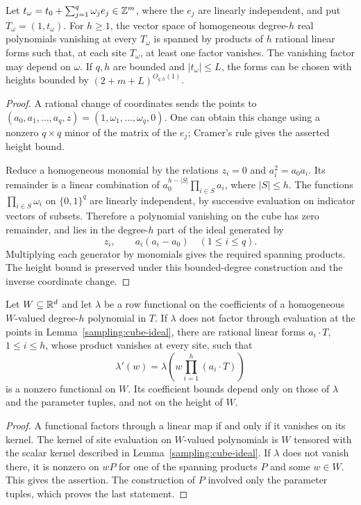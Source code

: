 \begin{lemma}
\label{sampling:cube-ideal}
Let $t_\omega=t_0+\sum_{j=1}^q\omega_je_j\in\mathbb Z^m$, where the
$e_j$ are linearly independent, and put $T_\omega=(1,t_\omega)$.
For $h\ge1$, the vector space of homogeneous degree-$h$ real polynomials
vanishing at every $T_\omega$ is spanned by products of $h$ rational linear
forms such that, at each site $T_\omega$, at least one factor vanishes.
The vanishing factor may depend on $\omega$.
If $q,h$ are bounded and $|t_\omega|\le L$, the forms can be chosen with
heights bounded by $(2+m+L)^{O_{q,h}(1)}$.
\end{lemma}
\begin{proof}
A rational change of coordinates sends the points to
$(a_0,a_1,\ldots,a_q,z)=(1,\omega_1,\ldots,\omega_q,0)$.
One can obtain this change using a nonzero $q\times q$ minor of the matrix
of the $e_j$; Cramer's rule gives the asserted height bound.

Reduce a homogeneous monomial by the relations $z_i=0$ and
$a_i^2=a_0a_i$.  Its remainder is a linear combination of
$a_0^{h-|S|}\prod_{i\in S}a_i$, where $|S|\le h$.
The functions $\prod_{i\in S}\omega_i$ on $\{0,1\}^q$ are linearly
independent, by successive evaluation on indicator vectors of subsets.
Therefore a polynomial vanishing on the cube has zero remainder, and lies
in the degree-$h$ part of the ideal generated by
\[
 z_i,\qquad a_i(a_i-a_0)\quad(1\le i\le q).
\]
Multiplying each generator by monomials gives the required spanning
products.  The height bound is preserved under this bounded-degree
construction and the inverse coordinate change.
\end{proof}

\begin{lemma}
\label{sampling:mode-removal}
Let $W\subseteq\mathbb R^d$ and let $\lambda$ be a row functional on the
coefficients of a homogeneous $W$-valued degree-$h$ polynomial in $T$.
If $\lambda$ does not factor through evaluation at the points in
Lemma~\ref{sampling:cube-ideal}, there are rational linear forms
$a_i\cdot T$, $1\le i\le h$, whose product vanishes at every site, such
that
\[
 \lambda'(w)=\lambda\left(w\prod_{i=1}^h(a_i\cdot T)\right)
\]
is a nonzero functional on $W$.  Its coefficient bounds depend only on
those of $\lambda$ and the parameter tuples, and not on the height of $W$.
\end{lemma}
\begin{proof}
A functional factors through a linear map if and only if it vanishes on
its kernel.  The kernel of site evaluation on $W$-valued polynomials is
$W$ tensored with the scalar kernel described in
Lemma~\ref{sampling:cube-ideal}.  If $\lambda$ does not vanish there,
it is nonzero on $wP$ for one of the spanning products $P$ and some $w\in W$.
This gives the assertion.  The construction of $P$ involved only the
parameter tuples, which proves the last statement.
\end{proof}

